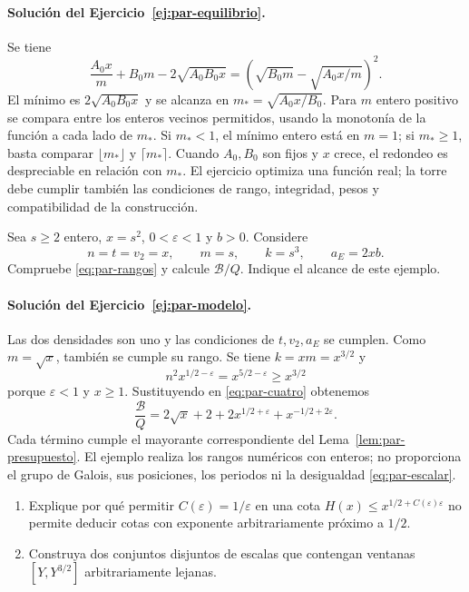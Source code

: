 \paragraph{Solución del Ejercicio~\ref{ej:par-equilibrio}.}
Se tiene
\[
 \frac{A_0x}{m}+B_0m-2\sqrt{A_0B_0x}
 =\left(\sqrt{B_0m}-\sqrt{A_0x/m}\right)^2.
\]
El mínimo es $2\sqrt{A_0B_0x}$ y se alcanza en
$m_*=\sqrt{A_0x/B_0}$. Para $m$ entero positivo se compara
entre los enteros vecinos permitidos, usando la monotonía de
la función a cada lado de $m_*$. Si $m_*<1$, el mínimo entero
está en $m=1$; si $m_*\ge1$, basta comparar
$\lfloor m_*\rfloor$ y $\lceil m_*\rceil$.
Cuando $A_0,B_0$ son fijos y $x$ crece, el redondeo es
despreciable en relación con $m_*$.
El ejercicio optimiza una función real; la torre debe cumplir
también las condiciones de rango, integridad, pesos y compatibilidad
de la construcción.

\begin{ejercicio}\label{ej:par-modelo}
Sea $s\ge2$ entero, $x=s^2$, $0<\varepsilon<1$ y $b>0$.
Considere
\[
 n=t=v_2=x,\qquad m=s,\qquad k=s^3,\qquad a_E=2xb.
\]
Compruebe \eqref{eq:par-rangos} y calcule $\mathcal B/Q$.
Indique el alcance de este ejemplo.
\end{ejercicio}

\paragraph{Solución del Ejercicio~\ref{ej:par-modelo}.}
Las dos densidades son uno y las condiciones de $t,v_2,a_E$
se cumplen. Como $m=\sqrt{x}$, también se cumple su rango.
Se tiene $k=xm=x^{3/2}$ y
\[
 n^2x^{1/2-\varepsilon}
 =x^{5/2-\varepsilon}\ge x^{3/2}
\]
porque $\varepsilon<1$ y $x\ge1$. Sustituyendo en
\eqref{eq:par-cuatro} obtenemos
\begin{equation}
 \frac{\mathcal B}{Q}
 =2\sqrt{x}+2+2x^{1/2+\varepsilon}
                         +x^{-1/2+2\varepsilon}.
 \label{eq:par-modelo}
\end{equation}
Cada término cumple el mayorante correspondiente del
Lema~\ref{lem:par-presupuesto}. El ejemplo realiza los rangos
numéricos con enteros; no proporciona el grupo de Galois, sus
posiciones, los periodos ni la desigualdad
\eqref{eq:par-escalar}.

\begin{ejercicio}\label{ej:par-cuantificadores}
\begin{enumerate}[label=\alph*)]
\item Explique por qué permitir $C(\varepsilon)=1/\varepsilon$
en una cota $H(x)\le x^{1/2+C(\varepsilon)\varepsilon}$
no permite deducir cotas con exponente arbitrariamente próximo
a $1/2$.
\item Construya dos conjuntos disjuntos de escalas que contengan
ventanas $[Y,Y^{3/2}]$ arbitrariamente lejanas.
\end{enumerate}
\end{ejercicio}

